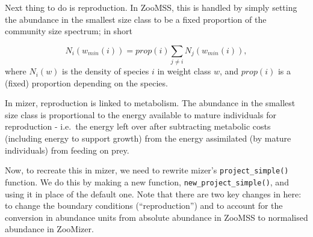 \documentclass[
]{article}
\begin{document}
Next thing to do is reproduction. In ZooMSS, this is handled by simply
setting the abundance in the smallest size class to be a fixed
proportion of the community size spectrum; in short

\[ N_i(w_{min}(i)) = prop(i) \sum_{j \neq i} N_j(w_{min}(i)),\] where
\(N_i(w)\) is the density of species \(i\) in weight class \(w\), and
\(prop(i)\) is a (fixed) proportion depending on the species.

In mizer, reproduction is linked to metabolism. The abundance in the
smallest size class is proportional to the energy available to mature
individuals for reproduction - i.e.~the energy left over after
subtracting metabolic costs (including energy to support growth) from
the energy assimilated (by mature individuals) from feeding on prey.

Now, to recreate this in mizer, we need to rewrite mizer's
\texttt{project\_simple()} function. We do this by making a new
function, \texttt{new\_project\_simple()}, and using it in place of the
default one. Note that there are two key changes in here: to change the
boundary conditions (``reproduction'') and to account for the conversion
in abundance units from absolute abundance in ZooMSS to normalised
abundance in ZooMizer.
\end{document}
